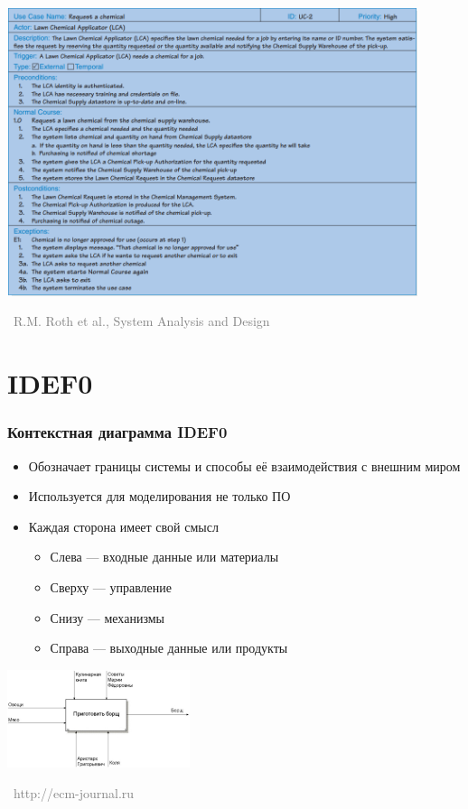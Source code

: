 \documentclass[xetex,mathserif,serif]{beamer}
\newcommand{\attribution}[1] {
    \vspace{-5mm}\begin{flushright}\begin{scriptsize}\textcolor{gray}{\textcopyright\, #1}\end{scriptsize}\end{flushright}
}
\begin{document}
    \begin{frame}
        \begin{center}
            \includegraphics[width=0.9\textwidth]{useCaseExample.png}
            \attribution{R.M. Roth et al., System Analysis and Design}
        \end{center}
    \end{frame}

    \section{IDEF0}

    \begin{frame}
        \frametitle{Контекстная диаграмма IDEF0}
        \begin{itemize}
            \item Обозначает границы системы и способы её взаимодействия с внешним миром
            \item Используется для моделирования не только ПО
            \item Каждая сторона имеет свой смысл
            \begin{itemize}
                \item Слева --- входные данные или материалы
                \item Сверху --- управление
                \item Снизу --- механизмы
                \item Справа --- выходные данные или продукты
            \end{itemize}
        \end{itemize}
        \begin{center}
            \includegraphics[width=0.4\textwidth]{idef0Example.png}
            \attribution{http://ecm-journal.ru}
        \end{center}
    \end{frame}
\end{document}

